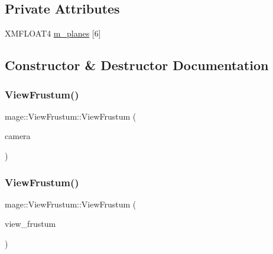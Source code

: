 \subsection*{Private Attributes}
\begin{DoxyCompactItemize}
\item 
X\+M\+F\+L\+O\+A\+T4 \hyperlink{classmage_1_1_view_frustum_aa5d8b90bfc005bd19566983401ccd511}{m\+\_\+planes} \mbox{[}6\mbox{]}
\end{DoxyCompactItemize}


\subsection{Constructor \& Destructor Documentation}
\hypertarget{classmage_1_1_view_frustum_ad1fd4a59f6cd0fd38289e66d4c6b5d51}{}\label{classmage_1_1_view_frustum_ad1fd4a59f6cd0fd38289e66d4c6b5d51} 
\subsubsection{\texorpdfstring{View\+Frustum()}{ViewFrustum()}\hspace{0.1cm}{\footnotesize\ttfamily [1/3]}}
{\footnotesize\ttfamily mage\+::\+View\+Frustum\+::\+View\+Frustum (\begin{DoxyParamCaption}\item[{const \hyperlink{classmage_1_1_camera}{Camera} \&}]{camera }\end{DoxyParamCaption})\hspace{0.3cm}{\ttfamily [explicit]}}

\hypertarget{classmage_1_1_view_frustum_abbd4ec6c2766d3f630bce16cefa8bc4d}{}\label{classmage_1_1_view_frustum_abbd4ec6c2766d3f630bce16cefa8bc4d} 
\subsubsection{\texorpdfstring{View\+Frustum()}{ViewFrustum()}\hspace{0.1cm}{\footnotesize\ttfamily [2/3]}}
{\footnotesize\ttfamily mage\+::\+View\+Frustum\+::\+View\+Frustum (\begin{DoxyParamCaption}\item[{const \hyperlink{classmage_1_1_view_frustum}{View\+Frustum} \&}]{view\+\_\+frustum }\end{DoxyParamCaption})\hspace{0.3cm}{\ttfamily [default]}}

